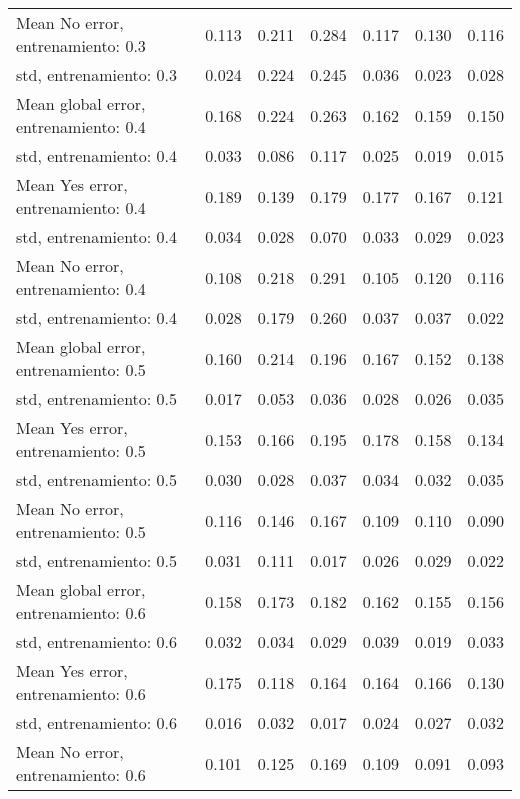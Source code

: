\begin{longtable}{p{4cm}|p{1.5cm}|p{1.5cm}|p{1.5cm}|p{1.5cm}|p{1.5cm}|p{1.5cm}}
Mean No error, entrenamiento: 0.3     & 0.113 & 0.211 &        0.284 &     0.117 &     0.130 & 0.116 \\
std, entrenamiento: 0.3               & 0.024 & 0.224 &        0.245 &     0.036 &     0.023 & 0.028 \\
Mean global error, entrenamiento: 0.4 & 0.168 & 0.224 &        0.263 &     0.162 &     0.159 & 0.150 \\
std, entrenamiento: 0.4               & 0.033 & 0.086 &        0.117 &     0.025 &     0.019 & 0.015 \\
Mean Yes error, entrenamiento: 0.4    & 0.189 & 0.139 &        0.179 &     0.177 &     0.167 & 0.121 \\
std, entrenamiento: 0.4               & 0.034 & 0.028 &        0.070 &     0.033 &     0.029 & 0.023 \\
Mean No error, entrenamiento: 0.4     & 0.108 & 0.218 &        0.291 &     0.105 &     0.120 & 0.116 \\
std, entrenamiento: 0.4               & 0.028 & 0.179 &        0.260 &     0.037 &     0.037 & 0.022 \\
Mean global error, entrenamiento: 0.5 & 0.160 & 0.214 &        0.196 &     0.167 &     0.152 & 0.138 \\
std, entrenamiento: 0.5               & 0.017 & 0.053 &        0.036 &     0.028 &     0.026 & 0.035 \\
Mean Yes error, entrenamiento: 0.5    & 0.153 & 0.166 &        0.195 &     0.178 &     0.158 & 0.134 \\
std, entrenamiento: 0.5               & 0.030 & 0.028 &        0.037 &     0.034 &     0.032 & 0.035 \\
Mean No error, entrenamiento: 0.5     & 0.116 & 0.146 &        0.167 &     0.109 &     0.110 & 0.090 \\
std, entrenamiento: 0.5               & 0.031 & 0.111 &        0.017 &     0.026 &     0.029 & 0.022 \\
Mean global error, entrenamiento: 0.6 & 0.158 & 0.173 &        0.182 &     0.162 &     0.155 & 0.156 \\
std, entrenamiento: 0.6               & 0.032 & 0.034 &        0.029 &     0.039 &     0.019 & 0.033 \\
Mean Yes error, entrenamiento: 0.6    & 0.175 & 0.118 &        0.164 &     0.164 &     0.166 & 0.130 \\
std, entrenamiento: 0.6               & 0.016 & 0.032 &        0.017 &     0.024 &     0.027 & 0.032 \\
Mean No error, entrenamiento: 0.6     & 0.101 & 0.125 &        0.169 &     0.109 &     0.091 & 0.093 \\

\end{longtable}
